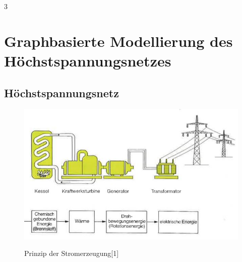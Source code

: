 3%

\chapter{Graphbasierte Modellierung des Höchstspannungsnetzes}
\label{Kapitel 2}
%

\section{Höchstspannungsnetz}
\label{Höchstspannungsnetz}
%
\begin{figure}[t]
	\centering
	{\includegraphics[scale=0.9]{bilder/pds}\label{fig_pds}
	}\\
	\caption[Prinzip der Stromerzeugung]{Prinzip der Stromerzeugung[1]}
	\label{fig_pds}
\end{figure}

